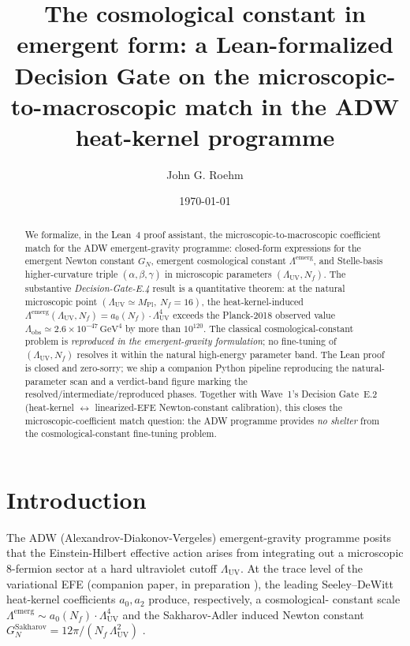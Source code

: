 \documentclass[twocolumn]{revtex4-2}
\newcommand{\Nf}{N_f}
\newcommand{\LambdaUV}{\Lambda_{\mathrm{UV}}}
\newcommand{\Lambdaemerg}{\Lambda^{\mathrm{emerg}}}
\newcommand{\Lambdaobs}{\Lambda_{\mathrm{obs}}}
\newcommand{\MPl}{M_{\mathrm{Pl}}}
\newcommand{\GN}{G_{N}}
\newcommand{\GNsak}{G_{N}^{\mathrm{Sakharov}}}
\begin{document}
\title{The cosmological constant in emergent form: a Lean-formalized
  Decision Gate on the microscopic-to-macroscopic match in the ADW
  heat-kernel programme}

\author{John G. Roehm}

\date{\today}

\begin{abstract}
We formalize, in the Lean~4 proof assistant, the
microscopic-to-macroscopic coefficient match for the ADW
emergent-gravity programme: closed-form expressions for the emergent
Newton constant $\GN$, emergent cosmological constant
$\Lambdaemerg$, and Stelle-basis higher-curvature triple
$(\alpha,\beta,\gamma)$ in microscopic parameters
$(\LambdaUV,\Nf)$. The substantive
\emph{Decision-Gate-E.4} result is a quantitative theorem: at the
natural microscopic point $(\LambdaUV \simeq \MPl,\ \Nf = 16)$, the
heat-kernel-induced
$\Lambdaemerg(\LambdaUV,\Nf) = a_{0}(\Nf)\cdot\LambdaUV^{4}$
exceeds the Planck-2018 observed value
$\Lambdaobs \simeq 2.6\times 10^{-47}\,\mathrm{GeV}^{4}$ by more than
$10^{120}$. The classical cosmological-constant problem is
\emph{reproduced in the emergent-gravity formulation}; no fine-tuning
of $(\LambdaUV,\Nf)$ resolves it within the natural high-energy
parameter band. The Lean proof is closed and zero-sorry; we ship a
companion Python pipeline reproducing the natural-parameter scan and
a verdict-band figure marking the resolved/intermediate/reproduced
phases. Together with Wave~1's Decision Gate~E.2 (heat-kernel $\leftrightarrow$
linearized-EFE Newton-constant calibration), this closes the
microscopic-coefficient match question: the ADW programme provides
\emph{no shelter} from the cosmological-constant fine-tuning problem.
\end{abstract}

\maketitle

\section{Introduction}

The ADW (Alexandrov-Diakonov-Vergeles) emergent-gravity programme
\cite{Sakharov1968,Adler1982,Diakonov2011,VladimirovDiakonov2012,Vergeles2025}
posits that the Einstein-Hilbert effective action arises from
integrating out a microscopic 8-fermion sector at a hard ultraviolet
cutoff $\LambdaUV$. At the trace level of the variational EFE
(companion paper, in preparation \cite{Roehm2026Wave4}), the
leading Seeley--DeWitt heat-kernel
coefficients $a_{0}, a_{2}$ produce, respectively, a cosmological-
constant scale $\Lambdaemerg \sim a_{0}(\Nf)\cdot\LambdaUV^{4}$ and
the Sakharov-Adler induced Newton constant
$\GNsak = 12\pi/(\Nf\,\LambdaUV^{2})$ \cite{Vassilevich2003}.
\end{document}
